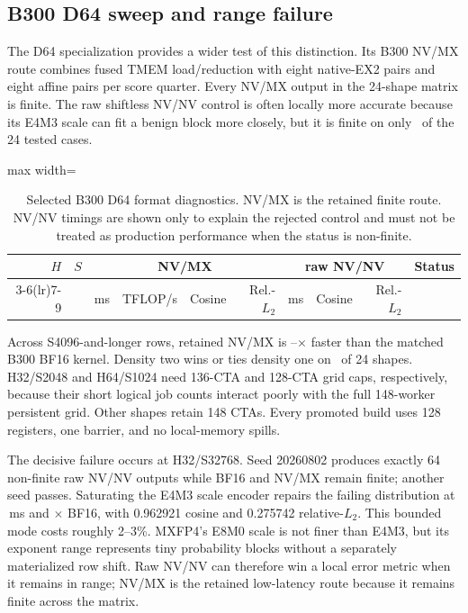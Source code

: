 \subsection{B300 D64 sweep and range failure}
\label{app:nvnv-d64}

The D64 specialization provides a wider test of this distinction. Its B300
NV/MX route combines fused TMEM load/reduction with eight native-EX2 pairs and
eight affine pairs per score quarter. Every NV/MX output in the 24-shape
matrix is finite. The raw shiftless NV/NV control is often locally more
accurate because its E4M3 scale can fit a benign block more closely, but it is
finite on only \BThreeDsixtyfourNVNVFiniteCases\ of the 24 tested cases.

\begin{table}[htbp]
\centering
\caption{Selected B300 D64 format diagnostics. NV/MX is the retained finite
route. NV/NV timings are shown only to explain the rejected control and must
not be treated as production performance when the status is non-finite.}
\label{tab:b300-d64-diagnostic}
\scriptsize
\begin{adjustbox}{max width=\textwidth}
\begin{tabular}{rrrrrrrrrl}
\toprule
$H$ & $S$ & \multicolumn{4}{c}{NV/MX} & \multicolumn{3}{c}{raw NV/NV} & Status \\
\cmidrule(lr){3-6}\cmidrule(lr){7-9}
 & & ms & TFLOP/s & Cosine & Rel.-$L_2$ & ms & Cosine & Rel.-$L_2$ & \\
\midrule
%
\end{tabular}
\end{adjustbox}
\end{table}

Across S4096-and-longer rows, retained NV/MX is
\BThreeDsixtyfourMinSpeedup--\BThreeDsixtyfourMaxSpeedup$\times$ faster than
the matched B300 BF16 kernel. Density two wins or ties density one on
\BThreeDsixtyfourDensityWins\ of 24 shapes. H32/S2048 and H64/S1024 need
136-CTA and 128-CTA grid caps, respectively, because their short logical job
counts interact poorly with the full 148-worker persistent grid. Other shapes
retain 148 CTAs. Every promoted build uses 128 registers, one barrier, and no
local-memory spills.

The decisive failure occurs at H32/S32768. Seed 20260802 produces exactly 64
non-finite raw NV/NV outputs while BF16 and NV/MX remain finite; another seed
passes. Saturating the E4M3 scale encoder repairs the failing distribution at
\BThreeDsixtyfourBoundedNVNVTime\,ms and
\BThreeDsixtyfourBoundedNVNVSpeedup$\times$ BF16, with 0.962921 cosine and
0.275742 relative-$L_2$. This bounded mode costs roughly 2--3\%. MXFP4's E8M0
scale is not finer than E4M3, but its exponent range represents tiny
probability blocks without a separately materialized row shift. Raw NV/NV can
therefore win a local error metric when it remains in range; NV/MX is the
retained low-latency route because it remains finite across the matrix.

